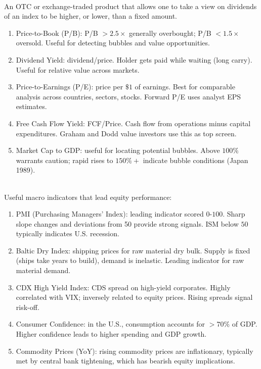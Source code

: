 \begin{remark} \\
An OTC or exchange-traded product that allows one to take a view on dividends of an index to be higher, or lower, than a fixed amount. 
\end{remark}

\begin{remark} 
\begin{enumerate}[label=\roman*.]
\setlength{\itemsep}{0pt}
\item Price-to-Book (P/B): P/B $> 2.5\times$ generally overbought; P/B $< 1.5\times$ oversold. Useful for detecting bubbles and value opportunities.
\item Dividend Yield: dividend/price. Holder gets paid while waiting (long carry). Useful for relative value across markets.
\item Price-to-Earnings (P/E): price per $\$1$ of earnings. Best for comparable analysis across countries, sectors, stocks. Forward P/E uses analyst EPS estimates.
\item Free Cash Flow Yield: FCF/Price. Cash flow from operations minus capital expenditures. Graham and Dodd value investors use this as top screen.
\item Market Cap to GDP: useful for locating potential bubbles. Above $100\%$ warrants caution; rapid rises to $150\%+$ indicate bubble conditions (Japan 1989).
\end{enumerate}
\end{remark}

\begin{remark} \\
Useful macro indicators that lead equity performance:
\begin{enumerate}[label=\roman*.]
\setlength{\itemsep}{0pt}
\item PMI (Purchasing Managers' Index): leading indicator scored $0$-$100$. Sharp slope changes and deviations from 50 provide strong signals. ISM below $50$ typically indicates U.S. recession.
\item Baltic Dry Index: shipping prices for raw material dry bulk. Supply is fixed (ships take years to build), demand is inelastic. Leading indicator for raw material demand.
\item CDX High Yield Index: CDS spread on high-yield corporates. Highly correlated with VIX; inversely related to equity prices. Rising spreads signal risk-off.
\item Consumer Confidence: in the U.S., consumption accounts for $>70\%$ of GDP. Higher confidence leads to higher spending and GDP growth.
\item Commodity Prices (YoY): rising commodity prices are inflationary, typically met by central bank tightening, which has bearish equity implications.
\end{enumerate}
\end{remark}

